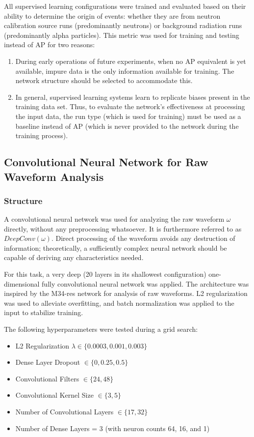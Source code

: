 \documentclass[10pt]{article}
\begin{document}
All supervised learning configurations were trained and evaluated based on their ability to determine the origin of events: whether they are from neutron calibration source runs (predominantly neutrons) or background radiation runs (predominantly alpha particles). This metric was used for training and testing instead of AP for two reasons:

\begin{enumerate}
    \item During early operations of future experiments, when no AP equivalent is yet available, impure data is the only information available for training. The network structure should be selected to accommodate this.
    \item In general, supervised learning systems learn to replicate biases present in the training data set. Thus, to evaluate the network's effectiveness at processing the input data, the run type (which is used for training) must be used as a baseline instead of AP (which is never provided to the network during the training process).
\end{enumerate}

\subsection{Convolutional Neural Network for Raw Waveform Analysis}

\subsubsection{Structure}

A convolutional neural network was used for analyzing the raw waveform $\omega$ directly, without any preprocessing whatsoever. It is furthermore referred to as $DeepConv(\omega)$. Direct processing of the waveform avoids any destruction of information; theoretically, a sufficiently complex neural network should be capable of deriving any characteristics needed.

For this task, a very deep (20 layers in its shallowest configuration) one-dimensional fully convolutional neural network was applied. The architecture was inspired by the M34-res network \cite{verydeepconvnets} for analysis of raw waveforms. L2 regularization was used to alleviate overfitting, and batch normalization was applied to the input to stabilize training.

The following hyperparameters were tested during a grid search:
\begin{itemize}
    \item L2 Regularization $\lambda \in \{0.0003, 0.001, 0.003\}$
    \item Dense Layer Dropout $\in \{0, 0.25, 0.5\}$
    \item Convolutional Filters $\in \{24, 48\}$
    \item Convolutional Kernel Size $\in \{3, 5\}$
    \item Number of Convolutional Layers $\in \{17, 32\}$
    \item Number of Dense Layers = 3 (with neuron counts 64, 16, and 1)
\end{itemize}
\end{document}
